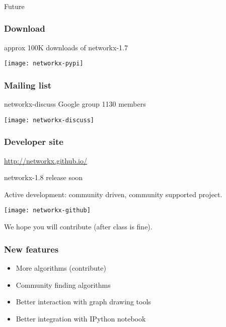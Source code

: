 \begin{frame}
\frametitle{}
\begin{center}
{\fontsize{49}{90}\selectfont
{\color{title} Future}}
\end{center}
\end{frame}

\begin{frame}
\frametitle{Download} approx 100K downloads of networkx-1.7
{\Large }

\bigskip

\centerline{\texttt{[image: networkx-pypi]}}

\end{frame}


\begin{frame}
\frametitle{Mailing list}

{\Large networkx-discuss Google group}
1130 members
\bigskip

\centerline{\texttt{[image: networkx-discuss]}}

\end{frame}


\begin{frame}
\frametitle{Developer site}
{\Large \url{http://networkx.github.io/}}

networkx-1.8 release soon

Active development: community driven, community supported project.

\centerline{\texttt{[image: networkx-github]}}


We hope you will contribute (after class is fine).

\end{frame}

\begin{frame}
\frametitle{New features}
\begin{itemize}
\item More algorithms (contribute)
\item Community finding algorithms
\item Better interaction with graph drawing tools
\item Better integration with IPython notebook

\end{itemize}

\end{frame}
